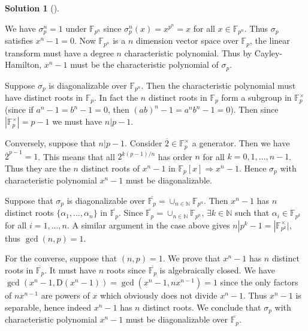 \documentclass{article}
\theoremstyle{definition}
\newtheorem*{sol}{Solution}
\newenvironment{sols}[1][]{%
  \begin{sol}[#1]$ $\par\nobreak\ignorespaces
}{%
  \end{sol}
}
\newcommand{\FF}{\mathbb F}
\newcommand{\NN}{\mathbb N}
\newcommand{\Ra}{\Rightarrow}
\begin{document}
\begin{sols}
	We have $\sigma_p^n = 1$ under $\FF_{p^n}$ since $\sigma_p^n(x) = x^{p^n} = x$ for all $x \in \FF_{p^n}$.
	Thus $\sigma_p$ satisfies $x^n - 1 = 0$.
	Now $\FF_{p^n}$ is a $n$ dimension vector space over $\FF_p$, the linear transform must have a degree $n$ characteristic polynomial.
	Thus by Cayley-Hamilton, $x^n - 1$ must be the characteristic polynomial of $\sigma_p$.
	
	\par Suppose $\sigma_p$ is diagonalizable over $\FF_{p^n}$.
	Then the characteristic polynomial must have distinct roots in $\FF_p$.
	In fact the $n$ distinct roots in $\FF_p$ form a subgroup in $\FF_p^\times$ (since if $a^n - 1 = b^n - 1 = 0$, then $(ab)^n - 1 = a^n b^n - 1 = 0$).
	Then since $|\FF_p^\times| = p - 1$ we must have $n| p - 1$.
	
	\par Conversely, suppose that $n | p - 1$.
	Consider $\overline{2} \in \FF_p^\times$ a generator.
	Then we have $\overline{2}^{p - 1} = 1$.
	This means that all $2^{k(p - 1)/n}$ has order $n$ for all $k = 0, 1, ..., n - 1$.
	Thus they are the $n$ distinct roots of $x^n - 1$ in $\FF_p[x] \Ra x^n - 1$. 
	Hence $\sigma_p$ with characteristic polynomial $x^n - 1$ must be diagonalizable.

	\par Suppose that $\sigma_p$ is diagonalizable over $\overline{\FF_p} = \cup_{n \in \NN} \FF_{p^n}$.
	Then $x^n - 1$ has $n$ distinct roots $\{\alpha_1, ..., \alpha_n\}$ in $\overline{\FF_p}$.
	Since $\overline{\FF_p} = \cup_{n \in \NN} \FF_{p^n}$, $\exists k \in \NN$ such that $\alpha_i \in \FF_{p^k}$ for all $i = 1, ..., n$. 
	A similar argument in the case above gives $n | p^k - 1 = |\FF_{p^k}^\times|$, thus $\gcd(n, p) = 1$.
	
   	\par For the converse, suppose that $(n, p) = 1$.
	We prove that $x^n - 1$ has $n$ distinct roots in $\overline{\FF_p}$.
	It must have $n$ roots since $\overline{\FF_p}$ is algebraically closed.
	We have $\gcd(x^n - 1, \text{D}(x^n - 1)) = \gcd(x^n - 1, n x^{n - 1}) = 1$ since the only factors of $n x^{n - 1}$ are powers of $x$ which obviously does not divide $x^n - 1$.
	Thus $x^n - 1$ is separable, hence indeed $x^n - 1$ has $n$ distinct roots.
	We conclude that $\sigma_p$ with characteristic polynomial $x^n - 1$ must be diagonalizable over $\overline{\FF_p}$.
\end{sols}
\end{document}
